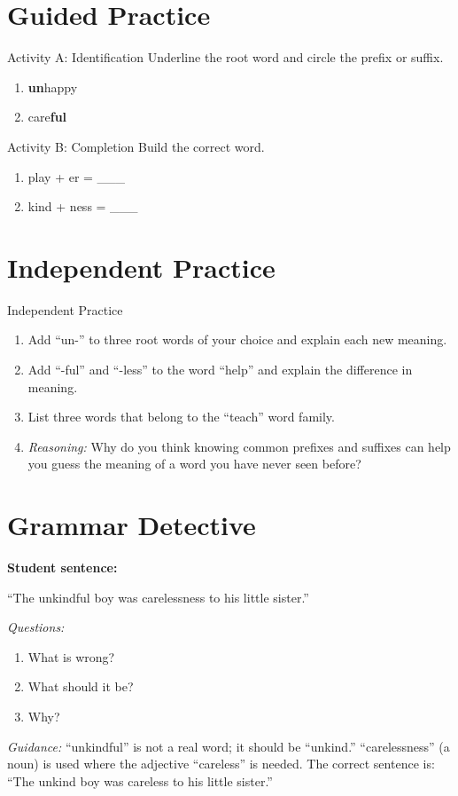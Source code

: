 \section{Guided Practice}
\begin{activitybox}{Activity A: Identification}
Underline the root word and circle the prefix or suffix.
\begin{enumerate}
    \item \textbf{un}happy
    \item care\textbf{ful}
\end{enumerate}
\end{activitybox}

\begin{activitybox}{Activity B: Completion}
Build the correct word.
\begin{enumerate}
    \item play + er = \_\_\_
    \item kind + ness = \_\_\_
\end{enumerate}
\end{activitybox}

\section{Independent Practice}
\begin{activitybox}{Independent Practice}
\begin{enumerate}
    \item Add ``un-'' to three root words of your choice and explain each new meaning.
    \item Add ``-ful'' and ``-less'' to the word ``help'' and explain the difference in meaning.
    \item List three words that belong to the ``teach'' word family.
    \item \textit{Reasoning:} Why do you think knowing common prefixes and suffixes can help you guess the meaning of a word you have never seen before?
\end{enumerate}
\end{activitybox}

\section{Grammar Detective}
\begin{detectivebox}
\textbf{Student sentence:}

``The unkindful boy was carelessness to his little sister.''

\textit{Questions:}
\begin{enumerate}
    \item What is wrong?
    \item What should it be?
    \item Why?
\end{enumerate}

\textit{Guidance:} ``unkindful'' is not a real word; it should be ``unkind.'' ``carelessness'' (a noun) is used where the adjective ``careless'' is needed. The correct sentence is: ``The unkind boy was careless to his little sister.''
\end{detectivebox}

